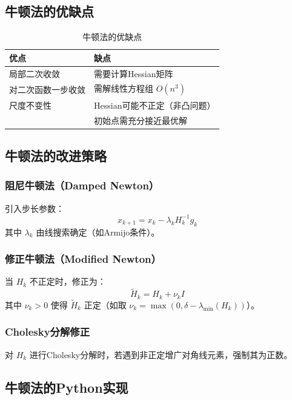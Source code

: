 \subsection{牛顿法的优缺点}

\begin{table}[H]
\centering
\caption{牛顿法的优缺点}
\begin{tabular}{@{}ll@{}}
\toprule
\textbf{优点} & \textbf{缺点} \\
\midrule
局部二次收敛 & 需要计算Hessian矩阵 \\
对二次函数一步收敛 & 需解线性方程组 $O(n^3)$ \\
尺度不变性 & Hessian可能不正定（非凸问题） \\
& 初始点需充分接近最优解 \\
\bottomrule
\end{tabular}
\end{table}

\subsection{牛顿法的改进策略}\label{sec:newton-improvements}

\subsubsection{阻尼牛顿法（Damped Newton）}

引入步长参数：
\[
x_{k+1} = x_k - \lambda_k H_k^{-1} g_k
\]
其中 $\lambda_k$ 由线搜索确定（如Armijo条件）。

\subsubsection{修正牛顿法（Modified Newton）}

当 $H_k$ 不正定时，修正为：
\[
\tilde{H}_k = H_k + \nu_k I
\]
其中 $\nu_k > 0$ 使得 $\tilde{H}_k$ 正定（如取 $\nu_k = \max(0, \delta - \lambda_{\min}(H_k))$）。

\subsubsection{Cholesky分解修正}

对 $H_k$ 进行Cholesky分解时，若遇到非正定增广对角线元素，强制其为正数。

\subsection{牛顿法的Python实现}\label{sec:newton-code}

